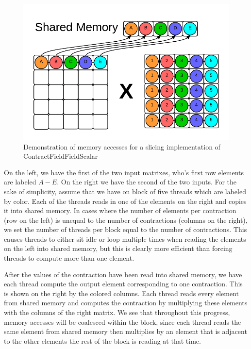 \begin{figure}
    \centering
    \includegraphics[scale = .55]{ContractFieldFieldScalarGraphic}
    \caption{Demonstration of memory accesses for a slicing implementation of ContractFieldFieldScalar}
\end{figure}

	On the left, we have the first of the two input matrixes, who's first row elements are labeled $A-E$. On the right we have the second of the two inputs. For the sake of simplicity, assume that we have on block of five threads which are labeled by color. Each of the threads reads in one of the elements on the right and copies it into shared memory. In cases where the number of elements per contraction (row on the left) is unequal to the number of contractions (columns on the right), we set the number of threads per block equal to the number of contractions. This causes threads to either sit idle or loop multiple times when reading the elements on the left into shared memory, but this is clearly more efficient than forcing threads to compute more than one element.
	
	After the values of the contraction have been read into shared memory, we have each thread compute the output element corresponding to one contraction. This is shown on the right by the colored columns. Each thread reads every element from shared memory and computes the contraction by multiplying these elements with the columns of the right matrix. We see that throughout this progress, memory accesses will be coalesced within the block, since each thread reads the same element from shared memory then multiplies by an element that is adjacent to the other elements the rest of the block is reading at that time. 
	
